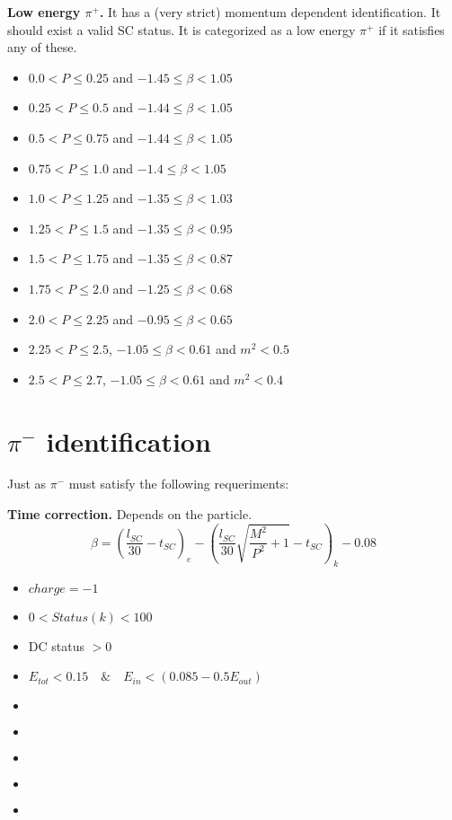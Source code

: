 \textbf{Low energy $\pi^+$.} It has a (very strict) momentum dependent identification. It should exist a valid SC status. It is categorized as a low energy $\pi^+$ if it satisfies any of these.
\begin{itemize}
    \item $0.0 < P \le 0.25$ and $-1.45 \le \beta < 1.05$
    \item $0.25 < P \le 0.5$ and $-1.44 \le \beta < 1.05$
    \item $0.5 < P \le 0.75$ and $-1.44 \le \beta < 1.05$
    \item $0.75 < P \le 1.0$ and $-1.4 \le \beta < 1.05$
    \item $1.0 < P \le 1.25$ and $-1.35 \le \beta < 1.03$
    \item $1.25 < P \le 1.5$ and $-1.35 \le \beta < 0.95$
    \item $1.5 < P \le 1.75$ and $-1.35 \le \beta < 0.87$
    \item $1.75 < P \le 2.0$ and $-1.25 \le \beta < 0.68$
    \item $2.0 < P \le 2.25$ and $-0.95 \le \beta < 0.65$
    \item $2.25 < P \le 2.5$, $-1.05 \le \beta < 0.61$ and $m^2 < 0.5$
    \item $2.5 < P \le 2.7$, $-1.05 \le \beta < 0.61$ and $m^2 < 0.4$
\end{itemize}

\section{$\pi^{-}$ identification}            

Just as $\pi^{-}$ must satisfy the following requeriments:


\textbf{Time correction.} Depends on the particle.
\begin{equation}
    \beta = \left(\frac{l_{SC}}{30} - t_{SC}\right)_e - \left(\frac{l_{SC}}{30} \sqrt{\frac{M^2}{P^2} + 1} - t_{SC} \right)_{k} - 0.08
\end{equation} 
    
    
    \begin{itemize}
        \item $ charge = -1 $
        \item $ 0 < Status(k) < 100$
        \item DC status $ > 0 $
        \item $ E_{tot} < 0.15 \quad\&\quad E_{in} < (0.085 - 0.5 E_{out}) $
        \item $  $
        \item $  $
        \item $  $
        \item $  $
        \item $  $
    \end{itemize}
    

